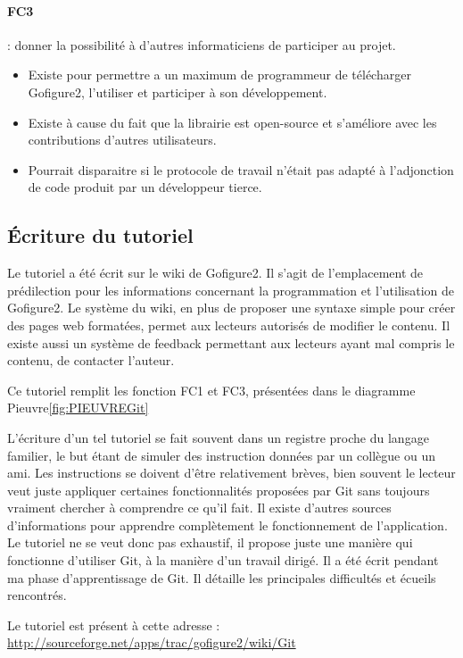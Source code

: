 \paragraph*{FC3} : donner la possibilité à d'autres informaticiens de participer au projet.
\begin{itemize}
  \item Existe pour permettre a un maximum de programmeur de télécharger Gofigure2, l'utiliser et participer à son développement.
  \item Existe à cause du fait que la librairie est open-source et s'améliore avec les contributions d'autres utilisateurs.
  \item Pourrait disparaitre si le protocole de travail n'était pas adapté à l'adjonction de code produit par un développeur tierce.
\end{itemize}


\subsection{Écriture du tutoriel}

Le tutoriel a été écrit sur le wiki de Gofigure2. Il s'agit de l'emplacement de prédilection pour les informations 
concernant la programmation et l'utilisation de Gofigure2. Le système du wiki, en plus de proposer une syntaxe simple 
pour créer des pages web formatées, permet aux lecteurs autorisés de modifier le contenu. 
Il existe aussi un système de feedback permettant aux lecteurs ayant mal compris le contenu, de contacter l'auteur.

Ce tutoriel remplit les fonction FC1 et FC3, présentées dans le diagramme Pieuvre\ref{fig:PIEUVREGit}

L'écriture d'un tel tutoriel se fait souvent dans un registre proche du langage familier,
le but étant de simuler des instruction données par un collègue ou un ami. 
Les instructions se doivent d'être relativement brèves, bien souvent le lecteur veut juste appliquer certaines fonctionnalités 
proposées par Git sans toujours vraiment chercher à comprendre ce qu'il fait. 
Il existe d'autres sources d'informations pour apprendre complètement le fonctionnement de l'application.
Le tutoriel ne se veut donc pas exhaustif, il propose juste une manière qui fonctionne d'utiliser Git,
à la manière d'un travail dirigé. Il a été écrit pendant ma phase d'apprentissage de Git. 
Il détaille les principales difficultés et écueils rencontrés. 

Le tutoriel est présent à cette adresse : \\
\url{http://sourceforge.net/apps/trac/gofigure2/wiki/Git}


